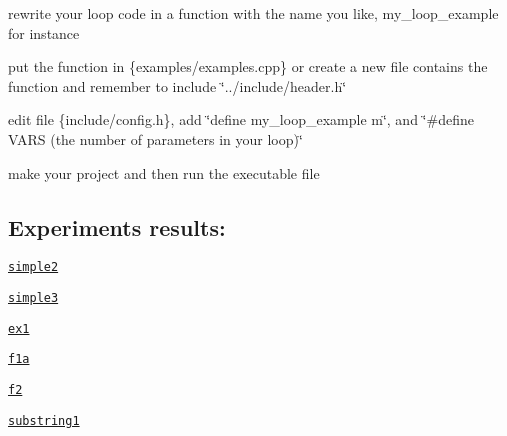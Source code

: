 \begin{DoxyItemize}
\item rewrite your loop code in a function with the name you like, my\+\_\+loop\+\_\+example for instance
\item put the function in \{examples/examples.\+cpp\} or create a new file contains the function and remember to include \char`\"{}../include/header.\+h\char`\"{}
\item edit file \{include/config.\+h\}, add \char`\"{}define my\+\_\+loop\+\_\+example m\char`\"{}, and \char`\"{}\#define V\+A\+R\+S (the number of parameters in your loop)\char`\"{}
\item make your project and then run the executable file
\end{DoxyItemize}

\subsection*{Experiments results\+:}


\begin{DoxyItemize}
\item \href{./results/simple2.html}{\tt simple2}
\item \href{./results/simple3.html}{\tt simple3}
\item \href{./results/ex1.html}{\tt ex1}
\item \href{./results/f1a.html}{\tt f1a}
\item \href{./results/f2.html}{\tt f2}
\item \href{./results/substring1.html}{\tt substring1} 
\end{DoxyItemize}